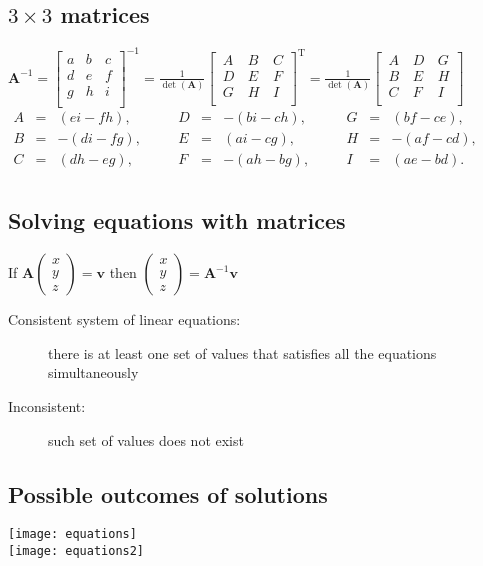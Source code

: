 \subsection{$3\times3$ matrices}
$\mathbf {A} ^{-1}={\begin{bmatrix}a&b&c\\d&e&f\\g&h&i\\\end{bmatrix}}^{-1}={\frac {1}{\det(\mathbf {A} )}}{\begin{bmatrix}\,A&\,B&\,C\\\,D&\,E&\,F\\\,G&\,H&\,I\\\end{bmatrix}}^{\mathrm {T} }={\frac {1}{\det(\mathbf {A} )}}{\begin{bmatrix}\,A&\,D&\,G\\\,B&\,E&\,H\\\,C&\,F&\,I\\\end{bmatrix}}$\\
$\begin{alignedat}{6}A&={}&(ei-fh),&\quad &D&={}&-(bi-ch),&\quad &G&={}&(bf-ce),\\B&={}&-(di-fg),&\quad &E&={}&(ai-cg),&\quad &H&={}&-(af-cd),\\C&={}&(dh-eg),&\quad &F&={}&-(ah-bg),&\quad &I&={}&(ae-bd).\\\end{alignedat}$

\subsection{Solving equations with matrices}
If $\mathbf{A}\begin{pmatrix}
	x\\y\\z
\end{pmatrix}=\mathbf{v}$ then $\begin{pmatrix}
	x\\y\\z
\end{pmatrix}=\mathbf{A}^{-1}\mathbf{v}$
\begin{description}
	\item[Consistent system of linear equations:] there is at least one set of values that satisfies all the equations simultaneously
	\item[Inconsistent:] such set of values does not exist
\end{description}

\subsection{Possible outcomes of solutions}
\texttt{[image: equations]}\\
\texttt{[image: equations2]}